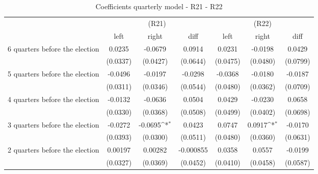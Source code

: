 \begin{table}[!ht]\centering \footnotesize
\def\sym#1{\ifmmode^{#1}\else\(^{#1}\)\fi}
\caption{Coefficients quarterly model - R21 - R22}
\begin{tabular}{l*{6}{c}}
\hline\hline
                    &\multicolumn{3}{c}{(R21)}&\multicolumn{3}{c}{(R22)}\\
&\multicolumn{1}{c}{left}&\multicolumn{1}{c}{right}&\multicolumn{1}{c}{diff}&\multicolumn{1}{c}{left}&\multicolumn{1}{c}{right}&\multicolumn{1}{c}{diff}\\
\hline
 6 quarters before the election&      0.0235         &     -0.0679         &      0.0914         &      0.0231         &     -0.0198         &      0.0429         \\
                    &    (0.0337)         &    (0.0427)         &    (0.0644)         &    (0.0475)         &    (0.0480)         &    (0.0799)         \\
[0.5em]
 5 quarters before the election&     -0.0496         &     -0.0197         &     -0.0298         &     -0.0368         &     -0.0180         &     -0.0187         \\
                    &    (0.0311)         &    (0.0346)         &    (0.0544)         &    (0.0480)         &    (0.0362)         &    (0.0709)         \\
[0.5em]
 4 quarters before the election&     -0.0132         &     -0.0636         &      0.0504         &      0.0429         &     -0.0230         &      0.0658         \\
                    &    (0.0330)         &    (0.0368)         &    (0.0508)         &    (0.0499)         &    (0.0402)         &    (0.0698)         \\
[0.5em]
 3 quarters before the election&     -0.0272         &     -0.0695\sym{*}  &      0.0423         &      0.0747         &      0.0917\sym{*}  &     -0.0170         \\
                    &    (0.0393)         &    (0.0300)         &    (0.0511)         &    (0.0480)         &    (0.0360)         &    (0.0631)         \\
[0.5em]
 2 quarters before the election&     0.00197         &     0.00282         &   -0.000855         &      0.0358         &      0.0557         &     -0.0199         \\
                    &    (0.0327)         &    (0.0369)         &    (0.0452)         &    (0.0410)         &    (0.0458)         &    (0.0587)         \\

\end{tabular}
\end{table}

